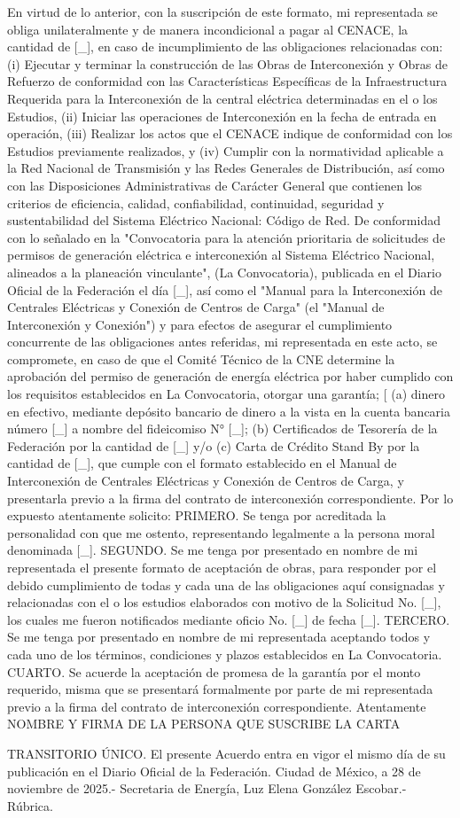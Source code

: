 En virtud de lo anterior, con la suscripción de este formato, mi representada se obliga unilateralmente y de manera incondicional a pagar al CENACE, la cantidad de [\_], en caso de incumplimiento de las obligaciones relacionadas con: (i) Ejecutar y terminar la construcción de las Obras de Interconexión y Obras de Refuerzo de conformidad con las Características Específicas de la Infraestructura Requerida para la Interconexión de la central eléctrica determinadas en el o los Estudios, (ii) Iniciar las operaciones de Interconexión en la fecha de entrada en operación, (iii) Realizar los actos que el CENACE indique de conformidad con los Estudios previamente realizados, y (iv) Cumplir con la normatividad aplicable a la Red Nacional de Transmisión y las Redes Generales de Distribución, así como con las Disposiciones Administrativas de Carácter General que contienen los criterios de eficiencia, calidad, confiabilidad, continuidad, seguridad y sustentabilidad del Sistema Eléctrico Nacional: Código de Red.
De conformidad con lo señalado en la "Convocatoria para la atención prioritaria de solicitudes de permisos de generación eléctrica e interconexión al Sistema Eléctrico Nacional, alineados a la planeación vinculante",  (La Convocatoria), publicada en el Diario Oficial de la Federación el día [\_], así como el "Manual para la Interconexión de Centrales Eléctricas y Conexión de Centros de Carga" (el "Manual de Interconexión y Conexión") y para efectos de asegurar el cumplimiento concurrente de las obligaciones antes referidas, mi representada en este acto, se compromete, en caso de que el Comité Técnico de la CNE determine la aprobación del permiso de generación de energía eléctrica por haber cumplido con los requisitos establecidos en La Convocatoria, otorgar una garantía; [ (a) dinero en efectivo, mediante depósito bancario de dinero a la vista en la cuenta bancaria número [\_] a nombre del fideicomiso N° [\_]; (b) Certificados de Tesorería de la Federación por la cantidad de [\_] y/o (c) Carta de Crédito Stand By por la cantidad de [\_], que cumple con el formato establecido en el Manual de Interconexión de Centrales Eléctricas y Conexión de Centros de Carga, y presentarla previo a la firma del contrato de interconexión correspondiente.
Por lo expuesto atentamente solicito:
PRIMERO. Se tenga por acreditada la personalidad con que me ostento, representando legalmente a la persona moral denominada [\_].
SEGUNDO. Se me tenga por presentado en nombre de mi representada el presente formato de aceptación de obras, para responder por el debido cumplimiento de todas y cada una de las obligaciones aquí consignadas y relacionadas con el o los estudios elaborados con motivo de la Solicitud No. [\_], los cuales me fueron notificados mediante oficio No. [\_] de fecha [\_].
TERCERO. Se me tenga por presentado en nombre de mi representada aceptando todos y cada uno de los términos, condiciones y plazos establecidos en La Convocatoria.
CUARTO. Se acuerde la aceptación de promesa de la garantía por el monto requerido, misma que se presentará formalmente por parte de mi representada previo a la firma del contrato de interconexión correspondiente.
Atentamente
NOMBRE Y FIRMA DE LA PERSONA QUE SUSCRIBE LA CARTA

 
 
TRANSITORIO
ÚNICO. El presente Acuerdo entra en vigor el mismo día de su publicación en el Diario Oficial  de la Federación.
Ciudad de México, a 28 de noviembre de 2025.- Secretaria de Energía, Luz Elena González Escobar.- Rúbrica.\par
\endgroup
